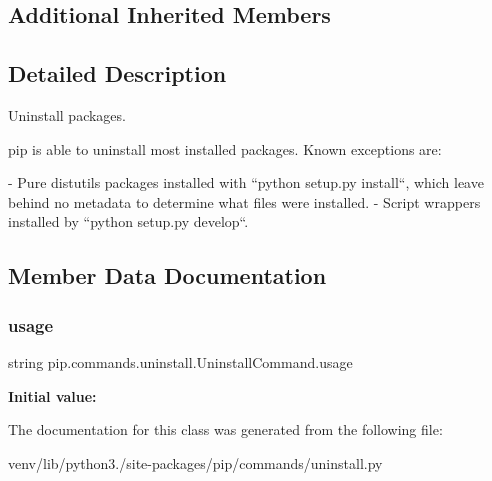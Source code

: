 \subsection*{Additional Inherited Members}


\subsection{Detailed Description}
\begin{DoxyVerb}Uninstall packages.

pip is able to uninstall most installed packages. Known exceptions are:

- Pure distutils packages installed with ``python setup.py install``, which
  leave behind no metadata to determine what files were installed.
- Script wrappers installed by ``python setup.py develop``.
\end{DoxyVerb}
 

\subsection{Member Data Documentation}
\mbox{\label{classpip_1_1commands_1_1uninstall_1_1_uninstall_command_a82365e72730b061eac4144b8be19313c}} 
\subsubsection{\texorpdfstring{usage}{usage}}
{\footnotesize\ttfamily string pip.\+commands.\+uninstall.\+Uninstall\+Command.\+usage\hspace{0.3cm}{\ttfamily [static]}}

{\bfseries Initial value\+:}
\begin{DoxyCode}
=  \textcolor{stringliteral}{"""}
\textcolor{stringliteral}{  %
\textcolor{stringliteral}{  %
\end{DoxyCode}


The documentation for this class was generated from the following file\+:\begin{DoxyCompactItemize}
\item 
venv/lib/python3./site-\/packages/pip/commands/uninstall.\+py\end{DoxyCompactItemize}
